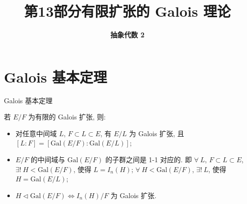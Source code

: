 \everymath{\displaystyle}



\title[有限扩张的 Galois 理论]{\texorpdfstring{\LARGE \bfseries 第13部分\quad 有限扩张的 Galois 理论}{第13部分 有限扩张的 Galois 理论}}
\author[抽象代数 2]{\Large \bfseries 抽象代数 2}
\date{}





\begin{frame}

\titlepage %

\end{frame}


\section[基本定理]{Galois 基本定理}


\begin{frame}{Galois 基本定理}

\begin{thm}
若 $E/F$ 为有限的 Galois 扩张, 则:
\begin{itemize}
\item[(i)] 对任意中间域 $L$, $F \subset L \subset E$, 有 $E/L$ 为 Galois 扩张,
  且 $[L:F] = [\mathrm{Gal}(E/F) : \mathrm{Gal}(E/L)]$;
\item[(ii)] $E/F$ 的中间域与 $\mathrm{Gal}(E/F)$ 的子群之间是 1-1 对应的.
  即 $\forall\ L$, $F \subset L \subset E$, $\exists!\ H < \mathrm{Gal}(E/F)$,
  使得 $L = I_n(H)$;
  $\forall\ H < \mathrm{Gal}(E/F)$, $\exists!\ L$, 使得 $H = \mathrm{Gal}(E/L)$;
\item[(iii)] $H \triangleleft \mathrm{Gal}(E/F) \iff I_n(H)/F$ 为 Galois 扩张.
\end{itemize}
\end{thm}

\end{frame}


